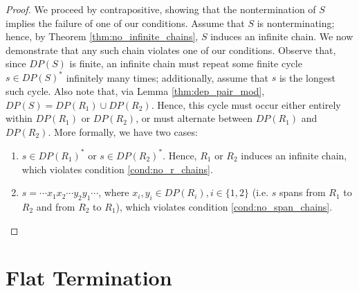 \documentclass{article}
\begin{document}
\begin{proof}
    We proceed by contrapositive, showing that the nontermination of $S$ implies the failure of one of our conditions. Assume that $S$ is nonterminating; hence, by Theorem \ref{thm:no_infinite_chains}, $S$ induces an infinite chain. We now demonstrate that any such chain violates one of our conditions. Observe that, since $DP(S)$ is finite, an infinite chain must repeat some finite cycle $s \in DP(S)^*$ infinitely many times; additionally, assume that $s$ is the longest such cycle. Also note that, via Lemma \ref{thm:dep_pair_mod}, $DP(S) = DP(R_1) \cup DP(R_2)$. Hence, this cycle must occur either entirely within $DP(R_1)$ or $DP(R_2)$, or must alternate between $DP(R_1)$ and $DP(R_2)$. More formally, we have two cases: \begin{enumerate}
        \item $s \in DP(R_1)^*$ or  $s \in DP(R_2)^*$. Hence, $R_1$ or $R_2$ induces an infinite chain, which violates condition \eqref{cond:no_r_chains}. 
        
        \item $s = \cdots x_1 x_2 \cdots y_2 y_1 \cdots$, where $x_i, y_i \in DP(R_i), i \in \{1, 2\}$ (i.e. $s$ spans from $R_1$ to $R_2$ and from $R_2$ to $R_1$), which violates condition \eqref{cond:no_span_chains}. 
    \end{enumerate}
\end{proof}



\section{Flat Termination}
\end{document}
